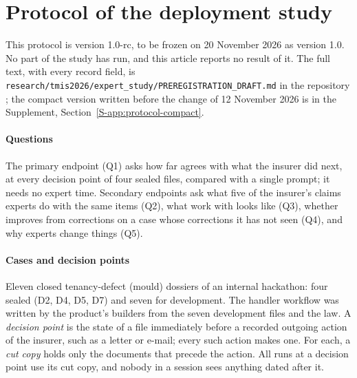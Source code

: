 \section{Protocol of the deployment study}
\label{app:protocol}

This protocol is version 1.0-rc, to be frozen on 20 November 2026 as version 1.0. No part of the study has run, and this article reports no result of it. The full text, with every record field, is \texttt{research/\allowbreak{}tmis2026/\allowbreak{}expert\_study/\allowbreak{}PREREGISTRATION\_\allowbreak{}DRAFT.md} in the repository \cite{casepath2026repo}; the compact version written before the change of 12 November 2026 is in the Supplement, Section~\ref{S-app:protocol-compact}.

\paragraph{Questions}
The primary endpoint (Q1) asks how far \casepath agrees with what the insurer did next, at every decision point of four sealed files, compared with a single prompt; it needs no expert time. Secondary endpoints ask what five of the insurer's claims experts do with the same items (Q2), what work with \casepath looks like (Q3), whether \casepath improves from corrections on a case whose corrections it has not seen (Q4), and why experts change things (Q5).

\paragraph{Cases and decision points}
Eleven closed tenancy-defect (mould) dossiers of an internal hackathon: four sealed (D2, D4, D5, D7) and seven for development.
 The handler workflow was written by the product's builders from the seven development files and the law. A \emph{decision point} is the state of a file immediately before a recorded outgoing action of the insurer, such as a letter or e-mail; every such action makes one. For each, a \emph{cut copy} holds only the documents that precede the action. All runs at a decision point use its cut copy, and nobody in a session sees anything dated after it.

